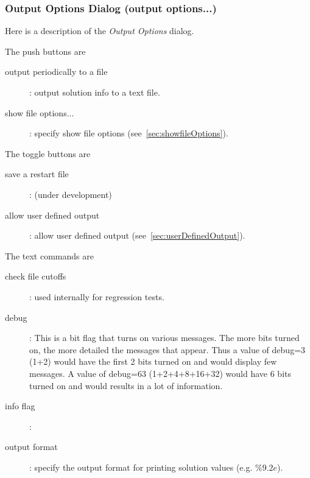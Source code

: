 \subsubsection{Output Options Dialog (output options...)}\label{sec:outputOptions}

Here is a description of the {\em Output Options} dialog.

\noindent The push buttons are
\begin{description}
  \item[\qquad output periodically to a file] : output solution info to a text file. 
  \item[\qquad show file options...] : specify show file options (see~\ref{sec:showfileOptions}).
\end{description}

\noindent The toggle buttons are 
\begin{description}
  \item[\qquad save a restart file ] : (under development)
  \item[\qquad allow user defined output] : allow user defined output (see~\ref{sec:userDefinedOutput}).
\end{description}

\noindent The text commands are 
\begin{description}
  \item[\qquad check file cutoffs] :  used internally for regression tests.
  \item[\qquad debug] : This is a bit flag that turns on various messages. The more bits turned
        on, the more detailed the messages that appear. Thus a value of debug=3 (1+2) would have the first
        2 bits turned on and would display few messages. A value of debug=63 (1+2+4+8+16+32) would have 6
        bits turned on and would results in a lot of information.
  \item[\qquad info flag] : 
  \item[\qquad output format] : specify the output format for printing solution values (e.g. $\%9.2e$). 
\end{description}

